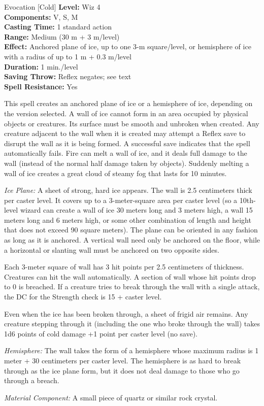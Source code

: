 {Evocation [Cold]}
{
	\textbf{Level:}
	Wiz 4\\
	\textbf{Components:}
	V, S, M\\
	\textbf{Casting Time:}
	1 standard action\\
	\textbf{Range:}
	Medium (30 m + 3 m/level)\\
	\textbf{Effect:}
	Anchored plane of ice, up to one 3-m square/level, or hemisphere of ice with a radius of up to 1 m + 0.3 m/level\\
	\textbf{Duration:}
	1 min./level\\
	\textbf{Saving Throw:}
	Reflex negates; see text\\
	\textbf{Spell Resistance:}
	Yes\\
}
{
	This spell creates an anchored plane of ice or a hemisphere of ice, depending on the version selected. A wall of ice cannot form in an area occupied by physical objects or creatures. Its surface must be smooth and unbroken when created. Any creature adjacent to the wall when it is created may attempt a Reflex save to disrupt the wall as it is being formed. A successful save indicates that the spell automatically fails. Fire can melt a wall of ice, and it deals full damage to the wall (instead of the normal half damage taken by objects). Suddenly melting a wall of ice creates a great cloud of steamy fog that lasts for 10 minutes.

	\textit{Ice Plane:}
	A sheet of strong, hard ice appears. The wall is 2.5 centimeters thick per caster level. It covers up to a 3-meter-square area per caster level (so a 10th-level wizard can create a wall of ice 30 meters long and 3 meters high, a wall 15 meters long and 6 meters high, or some other combination of length and height that does not exceed 90 square meters). The plane can be oriented in any fashion as long as it is anchored. A vertical wall need only be anchored on the floor, while a horizontal or slanting wall must be anchored on two opposite sides.

	Each 3-meter square of wall has 3 hit points per 2.5 centimeters of thickness. Creatures can hit the wall automatically. A section of wall whose hit points drop to 0 is breached. If a creature tries to break through the wall with a single attack, the DC for the Strength check is 15 + caster level.

	Even when the ice has been broken through, a sheet of frigid air remains. Any creature stepping through it (including the one who broke through the wall) takes 1d6 points of cold damage +1 point per caster level (no save).

	\textit{Hemisphere:}
	The wall takes the form of a hemisphere whose maximum radius is 1 meter + 30 centimeters per caster level. The hemisphere is as hard to break through as the ice plane form, but it does not deal damage to those who go through a breach.

	\textit{Material Component:}
	A small piece of quartz or similar rock crystal.

}
